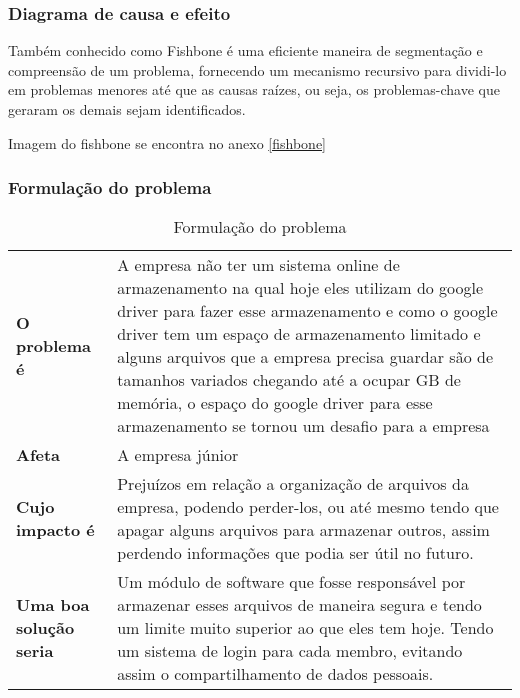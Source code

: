 \subsubsection{Diagrama de causa e efeito}

  Também conhecido como Fishbone é uma eficiente maneira de segmentação e compreensão de um problema, fornecendo um mecanismo recursivo para
  dividi-lo em problemas menores até que as causas raízes, ou seja, os problemas-chave que geraram os demais sejam identificados.

  Imagem do fishbone se encontra no anexo \ref{fishbone}

\subsubsection{Formulação do problema}

  \begin{table}[!htb]
    \centering
    \begin{tabular}{p{5cm}p{8cm}} \hline
      \rowcolor{gray!50}
      \multicolumn{2}{c}{Formulação} \\ \hline
      \textbf{O problema é}           & A empresa não ter um sistema online de armazenamento na qual hoje eles utilizam do google driver
                                        para fazer esse armazenamento e como o google driver tem um espaço de armazenamento limitado e
                                        alguns arquivos que a empresa precisa guardar são de tamanhos variados chegando até a ocupar GB
                                        de memória, o espaço do google driver para esse armazenamento se tornou um desafio para a empresa   \\
      \textbf{Afeta}                  & A empresa júnior                                                                                    \\
      \textbf{Cujo impacto é}         & Prejuízos em relação a organização de arquivos da empresa, podendo perder-los, ou até mesmo tendo
                                        que apagar alguns arquivos para armazenar outros, assim perdendo informações que podia ser útil no
                                        futuro.                                                                                             \\
      \textbf{Uma boa solução seria}  & Um módulo de software que fosse responsável por armazenar esses arquivos de maneira segura e tendo
                                        um limite muito superior ao que eles tem hoje. Tendo um sistema de login para cada membro, evitando
                                        assim o compartilhamento de dados pessoais.
    \end{tabular}
    \caption{Formulação do problema}
  \end{table}


